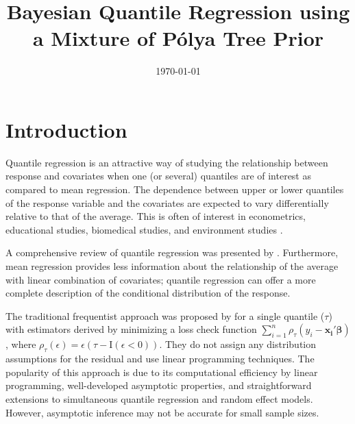 \documentclass[12pt]{article}
\title{Bayesian Quantile Regression using a  Mixture of P\'{o}lya Tree Prior}
\date{\today}
\author{}
\begin{document}

\maketitle{}

\section{Introduction}

Quantile regression is an attractive way of studying the relationship
between response and covariates when one (or several) quantiles are of
interest as compared to mean regression.  The dependence between upper
or lower quantiles of the response variable and the covariates are
expected to vary differentially relative to that of the average. This
is often of interest in econometrics, educational studies, biomedical
studies, and environment studies \citep{yu2001,buchinsky1994,
  buchinsky1998,he1998,koenker1999, wei2006, yu2003}.

A comprehensive review of quantile regression was presented by
\citet{koenker2005}.  Furthermore, mean regression provides less
information about the relationship of the average with linear
combination of covariates; quantile regression can offer a more
complete description of the conditional distribution of the response.

The traditional frequentist approach was proposed by
\citet{koenker1978} for a single quantile ($\tau$) with estimators
derived by minimizing a loss check function $\sum_{i=1}^n
\rho_{\tau}(y_i - \bm{x_i'\beta})$, where $\rho_{\tau}(\epsilon) =
\epsilon (\tau- \mathrm{I}(\epsilon < 0))$. They do not assign any
distribution assumptions for the residual and use linear programming
techniques.  The popularity of this approach is due to its
computational efficiency by linear programming, well-developed
asymptotic properties, and straightforward extensions to simultaneous
quantile regression and random effect models. However, asymptotic
inference may not be accurate for small sample sizes.
\end{document}
